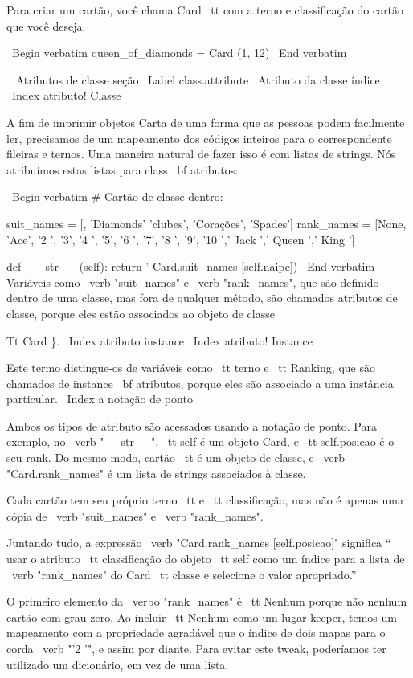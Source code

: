 \documentclass[10pt]{book}
\begin{document}
{{{{{{{{{{{{{{{Para criar um cartão, você chama {Card \ tt} com a
terno e classificação do cartão que você deseja.

\ Begin {verbatim}
queen_of_diamonds = Card (1, 12)
\ End {verbatim}
%


\ {} Atributos de classe seção
\ Label {} class.attribute
\ {Atributo da classe} índice
\ Index {atributo! Classe}

A fim de imprimir objetos Carta de uma forma que as pessoas podem facilmente
ler, precisamos de um mapeamento dos códigos inteiros para o correspondente
fileiras e ternos. Uma maneira natural de
fazer isso é com listas de strings. Nós atribuímos estas listas para {class \ bf
atributos}:

\ Begin {verbatim}
# Cartão de classe dentro:

    suit_names = [, 'Diamonds' 'clubes', 'Corações', 'Spades']
    rank_names = [None, 'Ace', '2 ', '3', '4 ', '5', '6 ', '7', 
              '8 ', '9', '10 ',' Jack ',' Queen ',' King ']

    def __ str__ (self):
        return '%
                             Card.suit_names [self.naipe])
\ End {verbatim}
%
Variáveis ​​como \ verb "suit_names" e \ verb "rank_names", que são
definido dentro de uma classe, mas fora de qualquer método, são chamados
atributos de classe, porque eles estão associados ao objeto de classe 
{Tt Card \}.
\ Index {atributo instance}
\ Index {atributo! Instance}

Este termo distingue-os de variáveis ​​como {\ tt terno} e {\ tt
  Ranking}, que são chamados de {instance \ bf atributos}, porque eles são
associado a uma instância particular.
\ Index {} a notação de ponto

Ambos os tipos de atributo são acessados ​​usando a notação de ponto. Para
exemplo, no \ verb "__str__", {\ tt self} é um objeto Card,
e {\ tt self.posicao} é o seu rank. Do mesmo modo, {cartão \ tt}
é um objeto de classe, e \ verb "Card.rank_names" é um
lista de strings associados à classe.

Cada cartão tem seu próprio terno {\ tt} e {\ tt classificação}, mas não
é apenas uma cópia de \ verb "suit_names" e \ verb "rank_names".

Juntando tudo, a expressão
\ verb "Card.rank_names [self.posicao]" significa `` usar o atributo {\ tt classificação}
do objeto {\ tt self} como um índice para a lista de \ verb "rank_names"
do {Card \ tt} classe e selecione o valor apropriado.''

O primeiro elemento da \ verbo "rank_names" é {\ tt Nenhum} porque não
nenhum cartão com grau zero. Ao incluir {\ tt Nenhum} como um lugar-keeper,
temos um mapeamento com a propriedade agradável que o índice de dois mapas para o
corda \ verb "'2 '", e assim por diante. Para evitar este tweak, poderíamos ter
utilizado um dicionário, em vez de uma lista.

}}}}}}}}}}}}}}}}
\end{document}
